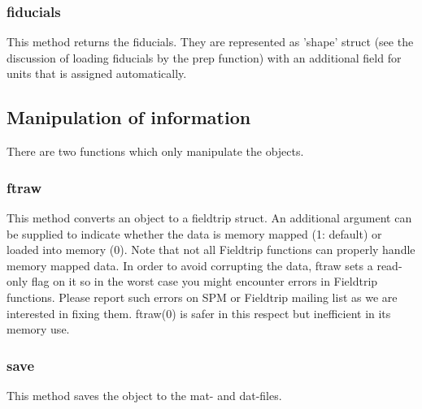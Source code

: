 \subsubsection{fiducials}
This method returns the fiducials. They are represented as 'shape' struct (see the
discussion of loading fiducials by the prep function) with an additional field for
units that is assigned automatically. 

\subsection{Manipulation of information}
There are two functions which only manipulate the objects. 

\subsubsection{ftraw}
This method converts an object to a fieldtrip struct. An additional
argument can be supplied to indicate whether the data is memory mapped
(1: default) or loaded into memory (0). Note that not all Fieldtrip functions
can properly handle memory mapped data. In order to avoid corrupting
the data, ftraw sets a read-only flag on it so in the worst case you might
encounter errors in Fieldtrip functions. Please report such errors on
SPM or Fieldtrip mailing list as we are interested in fixing them. ftraw(0) is 
safer in this respect but inefficient in its memory use. 


\subsubsection{save}
This method saves the object to the mat- and dat-files.


